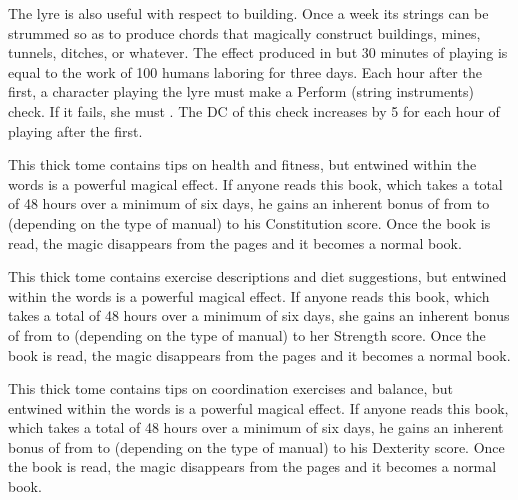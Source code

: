 {The lyre is also useful with respect to building. Once a week its strings can be strummed so as to produce chords that magically construct buildings, mines, tunnels, ditches, or whatever. The effect produced in but 30 minutes of playing is equal to the work of 100 humans laboring for three days. Each hour after the first, a character playing the lyre must make a  Perform (string instruments) check. If it fails, she must . The DC of this check increases by 5 for each hour of playing after the first.


 This thick tome contains tips on health and fitness, but entwined within the words is a powerful magical effect. If anyone reads this book, which takes a total of 48 hours over a minimum of six days, he gains an inherent bonus of from  to  (depending on the type of manual) to his Constitution score. Once the book is read, the magic disappears from the pages and it becomes a normal book. 


 This thick tome contains exercise descriptions and diet suggestions, but entwined within the words is a powerful magical effect. If anyone reads this book, which takes a total of 48 hours over a minimum of six days, she gains an inherent bonus of from  to  (depending on the type of manual) to her Strength score. Once the book is read, the magic disappears from the pages and it becomes a normal book. 


 This thick tome contains tips on coordination exercises and balance, but entwined within the words is a powerful magical effect. If anyone reads this book, which takes a total of 48 hours over a minimum of six days, he gains an inherent bonus of from  to  (depending on the type of manual) to his Dexterity score. Once the book is read, the magic disappears from the pages and it becomes a normal book. 

}
